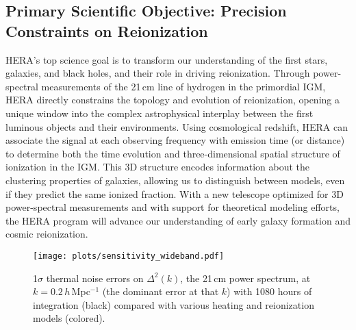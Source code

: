 \documentclass[preprint,11pt]{aastex}
\begin{document}
\vspace{-20pt}
\subsection{Primary Scientific Objective: Precision Constraints on Reionization}
\vspace{-5pt}
\label{sec:EoRPowerSpectra}


\noindent HERA's top science goal is to transform our understanding of the first stars, galaxies, 
and black holes, and their role in driving reionization. 
Through power-spectral measurements of the 21\,cm line of hydrogen in the primordial IGM,
HERA directly constrains the topology and evolution of reionization, 
opening a unique window into the complex astrophysical interplay between the 
first luminous objects and their environments.
Using cosmological redshift, HERA can associate 
the signal at each observing frequency with emission time (or distance) to determine both the time evolution
and three-dimensional spatial structure of ionization in the IGM.
This 3D structure encodes information about the clustering properties of galaxies,
allowing us to distinguish between models, even if they predict the same ionized fraction. 
With a new telescope optimized for 3D power-spectral measurements and with support for theoretical
modeling efforts, the HERA program will advance our understanding of early galaxy formation and cosmic reionization.


\begin{wrapfigure}{L}{0.49\textwidth}
\vspace{-15pt}
\centering
    \texttt{[image: plots/sensitivity\_wideband.pdf]}
  \vspace{-28pt}
  \caption{ 1$\sigma$ thermal noise errors on $\Delta^2(k)$, the 21\,cm power spectrum, at $k\!=\!0.2$\,$h$\,Mpc$^{-1}$ (the dominant error at that $k$)
with 1080 hours of integration (black)
compared with various heating and reionization models (colored).}
	\label{fig:Sensitivities}
  \vspace{-10pt}
\end{wrapfigure}
\end{document}
